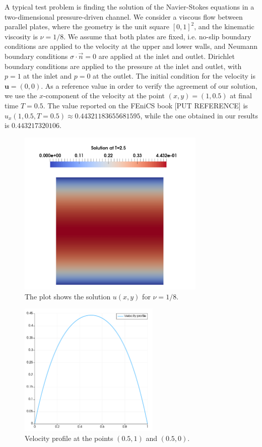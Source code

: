 \documentclass[11pt,a4paper,titlepage]{report}
\begin{document}
A typical test problem is finding the solution of the Navier-Stokes equations in a two-dimensional pressure-driven channel. We consider a viscous flow between parallel plates, where the geometry is the unit square $[0,1]^2$, and the kinematic viscosity is $\nu = 1/8$. We assume that both plates are fixed, i.e. no-slip boundary conditions are applied to the velocity at the upper and lower walls, and Neumann boundary conditions $\sigma \cdot \vec{n} = 0$ are applied at the inlet and outlet. Dirichlet boundary conditions are applied to the pressure at the inlet and outlet, with $p = 1$ at the inlet and $p = 0$ at the outlet. The initial condition for the velocity is $\mathbf{u} = (0,0)$. As a reference value in order to verify the agreement of our solution, we use the $x$-component of the velocity at the point $(x, y) = (1, 0.5)$ at final time $T = 0.5 $. The value reported on the FEniCS book [PUT REFERENCE] is $u_x(1, 0.5, T=0.5) \approx 0.44321183655681595$, while the one obtained in our results is $0.443217320106$.

\begin{figure}[h!]
\centering
\includegraphics[width=0.8\textwidth]{images/velocity_solution.png}
\caption{The plot shows the solution $u(x,y)$ for $\nu = 1/8$.}
\end{figure}

\begin{figure}[h!]
\centering
\includegraphics[width=0.6\textwidth]{images/velocity_profile.pdf}
\caption{Velocity profile at the points $(0.5, 1)$ and $(0.5, 0)$.}
\end{figure}
\end{document}
